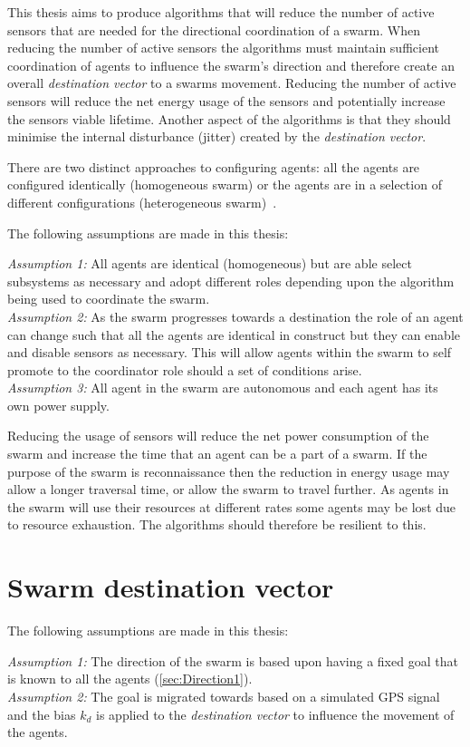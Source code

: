 This thesis aims to produce algorithms that will reduce the number of active sensors that are needed for the directional coordination of a swarm. When reducing the number of active sensors the algorithms must maintain sufficient coordination of agents to influence the swarm's direction and therefore create an overall \textit{destination vector} to a swarms movement. Reducing the number of active sensors will reduce the net energy usage of the sensors and potentially increase the sensors viable lifetime. Another aspect of the algorithms is that they should minimise the internal disturbance (jitter) created by the \textit{destination vector}.

There are two distinct approaches to configuring agents: all the agents are configured identically (homogeneous swarm) or the agents are in a selection of different configurations (heterogeneous swarm)~\cite{BS:13}. 

The following assumptions are made in this thesis:

\textit{Assumption 1:} All agents are identical (homogeneous) but are able select subsystems as necessary and adopt different roles depending upon the algorithm being used to coordinate the swarm. \\
\textit{Assumption 2:} As the swarm progresses towards a destination the role of an agent can change such that all the agents are identical in construct but they can enable and disable sensors as necessary. This will allow agents within the swarm to self promote to the coordinator role should a set of conditions arise.\\
\textit{Assumption 3:} All agent in the swarm are autonomous and each agent has its own power supply. 

Reducing the usage of sensors will reduce the net power consumption of the swarm and increase the time that an agent can be a part of a swarm. If the purpose of the swarm is reconnaissance then the reduction in energy usage may allow a longer traversal time, or allow the swarm to travel further. As agents in the swarm will use their resources at different rates some agents may be lost due to resource exhaustion. The algorithms should therefore be resilient to this.

\section{Swarm destination vector}
The following assumptions are made in this thesis:

\textit{Assumption 1:} The direction of the swarm is based upon having a fixed goal that is known to all the agents (\autoref{sec:Direction1}). \\
\textit{Assumption 2:} The goal is migrated towards based on a simulated GPS signal and the bias $k_d$ is applied to the \textit{destination vector} to influence the movement of the agents. 

